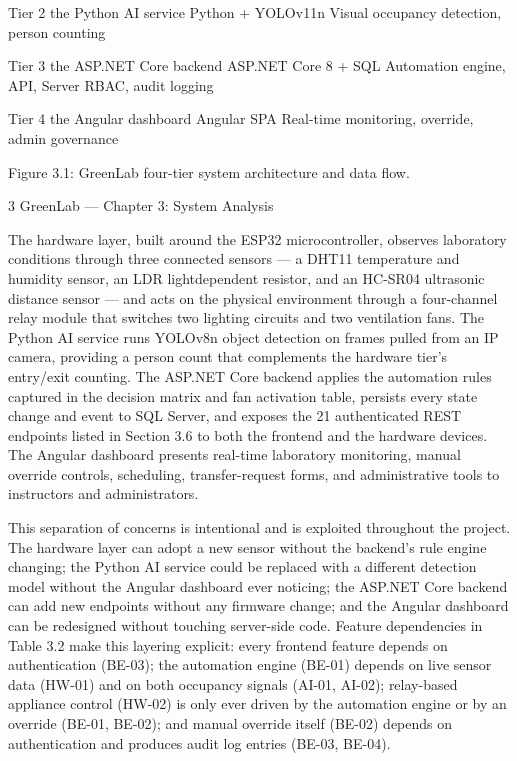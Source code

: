 Tier 2 the Python AI service Python + YOLOv11n Visual occupancy detection,
person counting

Tier 3 the ASP.NET Core backend ASP.NET Core 8 + SQL Automation engine, API,
Server RBAC, audit logging

Tier 4 the Angular dashboard Angular SPA Real-time monitoring,
override, admin governance




Figure 3.1: GreenLab four-tier system architecture and data flow.

3
GreenLab --- Chapter 3: System Analysis


The hardware layer, built around the ESP32 microcontroller, observes laboratory conditions
through three connected sensors --- a DHT11 temperature and humidity sensor, an LDR lightdependent resistor, and an HC-SR04 ultrasonic distance sensor --- and acts on the physical
environment through a four-channel relay module that switches two lighting circuits and two
ventilation fans. The Python AI service runs YOLOv8n object detection on frames pulled from an
IP camera, providing a person count that complements the hardware tier's entry/exit counting. The
ASP.NET Core backend applies the automation rules captured in the decision matrix and fan
activation table, persists every state change and event to SQL Server, and exposes the 21
authenticated REST endpoints listed in Section 3.6 to both the frontend and the hardware devices.
The Angular dashboard presents real-time laboratory monitoring, manual override controls,
scheduling, transfer-request forms, and administrative tools to instructors and administrators.

This separation of concerns is intentional and is exploited throughout the project. The hardware
layer can adopt a new sensor without the backend's rule engine changing; the Python AI service
could be replaced with a different detection model without the Angular dashboard ever noticing;
the ASP.NET Core backend can add new endpoints without any firmware change; and the Angular
dashboard can be redesigned without touching server-side code. Feature dependencies in Table 3.2
make this layering explicit: every frontend feature depends on authentication (BE-03); the
automation engine (BE-01) depends on live sensor data (HW-01) and on both occupancy signals
(AI-01, AI-02); relay-based appliance control (HW-02) is only ever driven by the automation
engine or by an override (BE-01, BE-02); and manual override itself (BE-02) depends on
authentication and produces audit log entries (BE-03, BE-04).

